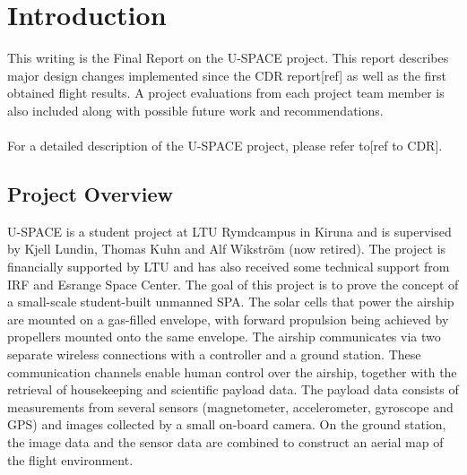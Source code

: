 \newpage
\chapter{Introduction}
\label{chap:introduction}
%
This writing is the Final Report on the \ac{U-SPACE} project. This report describes major design changes implemented since the \ac{CDR} report[ref] as well as the first obtained flight results. A project evaluations from each project team member is also included along with possible future work and recommendations.
\\\\
%
For a detailed description of the \ac{U-SPACE} project, please refer to[ref to CDR].
%
\section{Project Overview}
\ac{U-SPACE} is a student project at \ac{LTU} Rymdcampus in Kiruna and is supervised by Kjell Lundin, Thomas Kuhn and Alf Wikstr\"{o}m (now retired). The project is financially supported by \ac{LTU} and has also received some technical support from \ac{IRF} and Esrange Space Center. The goal of this project is to prove the concept of a small-scale student-built unmanned \ac{SPA}. The solar cells that power the airship are mounted on a gas-filled envelope, with forward propulsion being achieved by propellers mounted onto the same envelope. The airship communicates via two separate wireless connections with a controller and a ground station. These communication channels enable human control over the airship, together with the retrieval of housekeeping and scientific payload data. The payload data consists of measurements from several sensors (magnetometer, accelerometer, gyroscope and \ac{GPS}) and images collected by a small on-board camera. On the ground station, the image data and the sensor data are combined to construct an aerial map of the flight environment.